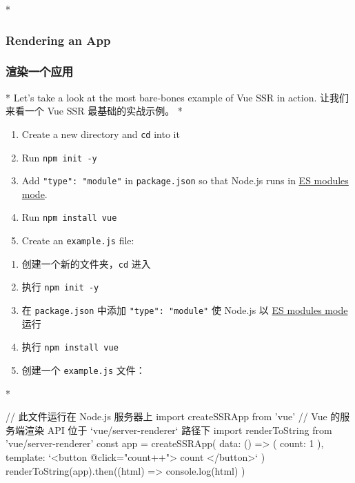 \begin{paracol}{2}
 
\switchcolumn[0]*%
\subsubsection{Rendering an App}
\switchcolumn
\subsubsection{渲染一个应用}
\switchcolumn[0]*%
Let's take a look at the most bare-bones example of Vue SSR in action.
\switchcolumn
让我们来看一个 Vue SSR 最基础的实战示例。
\switchcolumn[0]*%
\begin{enumerate}
\item
  Create a new directory and \texttt{cd} into it
\item
  Run \texttt{npm\ init\ -y}
\item
  Add \texttt{"type":\ "module"} in \texttt{package.json} so that
  Node.js runs in
  \href{https://nodejs.org/api/esm.html\#modules-ecmascript-modules}{ES
  modules mode}.
\item
  Run \texttt{npm\ install\ vue}
\item
  Create an \texttt{example.js} file:
\end{enumerate}
\switchcolumn
\begin{enumerate}
\item
  创建一个新的文件夹，\texttt{cd} 进入
\item
  执行 \texttt{npm\ init\ -y}
\item
  在 \texttt{package.json} 中添加 \texttt{"type":\ "module"} 使 Node.js
  以
  \href{https://nodejs.org/api/esm.html\#modules-ecmascript-modules}{ES
  modules mode} 运行
\item
  执行 \texttt{npm\ install\ vue}
\item
  创建一个 \texttt{example.js} 文件：
\end{enumerate}
\switchcolumn[0]*%
\begin{codeJs}
// 此文件运行在 Node.js 服务器上
import { createSSRApp } from 'vue'
// Vue 的服务端渲染 API 位于 `vue/server-renderer` 路径下
import { renderToString } from 'vue/server-renderer'
const app = createSSRApp({
  data: () => ({ count: 1 }),
  template: `<button @click="count++">{{ count }}</button>`
})
renderToString(app).then((html) => {
  console.log(html)
})
\end{codeJs}
\switchcolumn
\begin{codeJs}

\end{codeJs}
\end{paracol}
